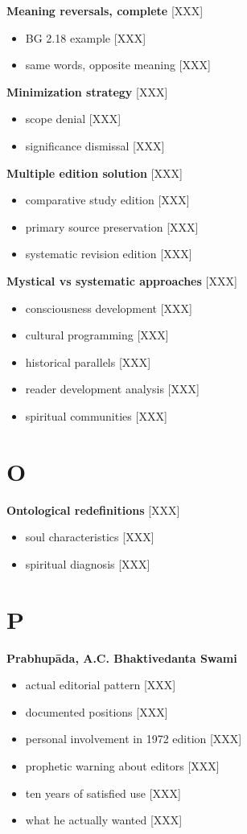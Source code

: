\documentclass[11pt,twoside]{book}
\begin{document}
\textbf{\textbf{Meaning reversals, complete}} {[}XXX]
\begin{itemize}
\item BG 2.18 example [XXX]
\item same words, opposite meaning [XXX]
\end{itemize}

\textbf{\textbf{Minimization strategy}} {[}XXX]
\begin{itemize}
\item scope denial [XXX]
\item significance dismissal [XXX]
\end{itemize}

\textbf{\textbf{Multiple edition solution}} {[}XXX]
\begin{itemize}
\item comparative study edition [XXX]
\item primary source preservation [XXX]
\item systematic revision edition [XXX]
\end{itemize}

\textbf{\textbf{Mystical vs systematic approaches}} {[}XXX]
\begin{itemize}
\item consciousness development [XXX]
\item cultural programming [XXX]
\item historical parallels [XXX]
\item reader development analysis [XXX]
\item spiritual communities [XXX]
\end{itemize}
\section*{O}
\label{sec:orgdae951b}

\textbf{\textbf{Ontological redefinitions}} {[}XXX]
\begin{itemize}
\item soul characteristics [XXX]
\item spiritual diagnosis [XXX]
\end{itemize}
\section*{P}
\label{sec:org4ad46c8}

\textbf{\textbf{Prabhupāda, A.C. Bhaktivedanta Swami}}
\begin{itemize}
\item actual editorial pattern [XXX]
\item documented positions [XXX]
\item personal involvement in 1972 edition [XXX]
\item prophetic warning about editors [XXX]
\item ten years of satisfied use [XXX]
\item what he actually wanted [XXX]
\end{itemize}
\end{document}
